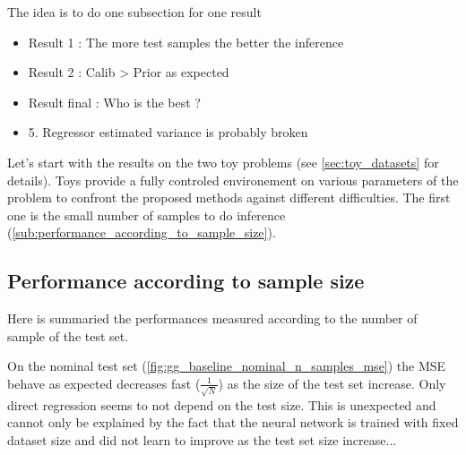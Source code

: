 The idea is to do one subsection for one result 
\begin{itemize}
  \item Result 1 : The more test samples the better the inference
  \item Result 2 : Calib > Prior as expected
  \item Result final : Who is the best ? 
  \item 5. Regressor estimated variance is probably broken
\end{itemize}


Let's start with the results on the two toy problems (see \autoref{sec:toy_datasets} for details).
Toys provide a fully controled environement on various parameters of the problem to confront the proposed methods against different difficulties.
The first one is the small number of samples to do inference (\autoref{sub:performance_according_to_sample_size}).










\subsection{Performance according to sample size} %
\label{sub:performance_according_to_sample_size}

Here is summaried the performances measured according to the number of sample of the test set.

On the nominal test set (\autoref{fig:gg_baseline_nominal_n_samples_mse}) the MSE behave as expected \ie decreases fast ($\frac{1}{\sqrt{N}}$) as the size of the test set increase.
Only direct regression seems to not depend on the test size.
This is unexpected and cannot only be explained by the fact that the neural network is trained with fixed dataset size and did not learn to improve as the test set size increase...



